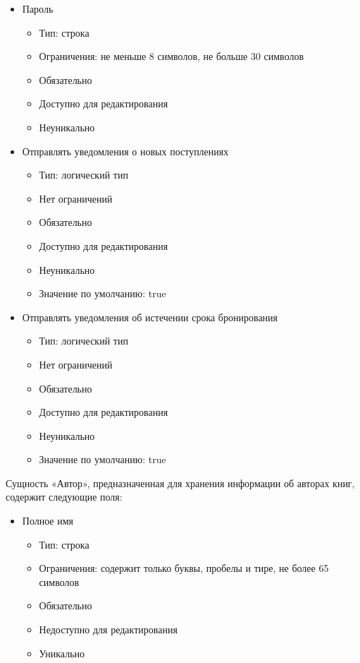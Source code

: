\documentclass[data-specification.tex]{subfiles}
\begin{document}
\begin{itemize}
\begin{itemize}
    \end{itemize}
    \item Пароль
    \begin{itemize}
        \item Тип: строка
        \item Ограничения: не меньше 8 символов, не больше 30 символов
        \item Обязательно
        \item Доступно для редактирования
        \item Неуникально
    \end{itemize}
    \item Отправлять уведомления о новых поступлениях
    \begin{itemize}
        \item Тип: логический тип
        \item Нет ограничений 
        \item Обязательно
        \item Доступно для редактирования
        \item Неуникально
        \item Значение по умолчанию: true
    \end{itemize}
    \item Отправлять уведомления об истечении срока бронирования
    \begin{itemize}
        \item Тип: логический тип
        \item Нет ограничений 
        \item Обязательно
        \item Доступно для редактирования
        \item Неуникально
        \item Значение по умолчанию: true
    \end{itemize}
\end{itemize}
\par
Сущность «Автор», предназначенная для хранения информации об авторах книг, содержит следующие поля:
\begin{itemize}
    \item Полное имя
    \begin{itemize}
        \item Тип: строка
        \item Ограничения: содержит только буквы, пробелы и тире, не более 65 символов
        \item Обязательно
        \item Недоступно для редактирования
        \item Уникально
    \end{itemize}
\end{itemize}
\end{document}

